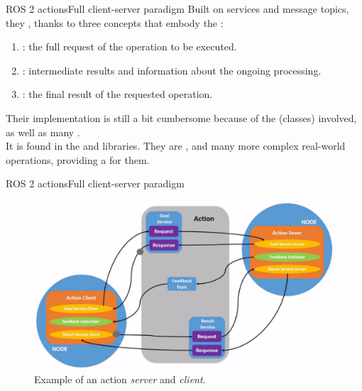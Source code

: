 \begin{frame}{ROS 2 actions}{Full client-server paradigm}
  Built on services and message topics, they , thanks to three concepts that embody the :
  \begin{enumerate}
    \item {}: the full request of the operation to be executed.
    \item {}: intermediate results and information about the ongoing processing.
    \item {}: the final result of the requested operation.
  \end{enumerate}
  \vspace{.5cm}
  Their implementation is still a bit cumbersome because of the  (classes) involved, as well as many .\\
  It is found in the \href{https://github.com/ros2/rclcpp/tree/humble/rclcpp_action}{} and \href{https://github.com/ros2/rclpy/tree/humble/rclpy/rclpy/action}{} libraries.
  \newline\newline
  They are , and many more complex real-world operations, providing a  for them.
\end{frame}
\begin{frame}{ROS 2 actions}{Full client-server paradigm}
  \begin{figure}
    \centering
    \includegraphics[scale=.37]{ros2Act.png}
    \caption{Example of an action \emph{server} and \emph{client}.}
    \label{fig:ros2Act}
  \end{figure}
\end{frame}
